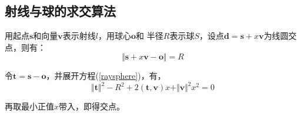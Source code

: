 \documentclass[a4paper,12pt]{article}
\renewcommand{\listingscaption}[1]{\begin{center}CODE: #1\end{center}\vspace{-20pt}}
\theoremstyle{plain}
\numberwithin{thmdef}{section}
\begin{document}
\subsection{射线与球的求交算法}
用起点$\mathbf{s}$和向量$\mathbf{v}$表示射线$l$，用球心$\mathbf{o}$和%
半径$R$表示球$S$，设点$\mathbf{d}=\mathbf{s}+x\mathbf{v}$为线圆交点，则有：
\begin{equation}
\Vert\mathbf{s}+x\mathbf{v}-\mathbf{o}\Vert=R
\label{raysphere}
\end{equation}\par
令$\mathbf{t}=\mathbf{s}-\mathbf{o}$，并展开方程(\ref{raysphere})，有，
\begin{equation}
\Vert\mathbf{t}\Vert^2-R^2+2(\mathbf{t},\mathbf{v})x%
+\Vert\mathbf{v}\Vert^2x^2=0
\end{equation}\par
再取最小正值$x$带入，即得交点。

\end{document}
